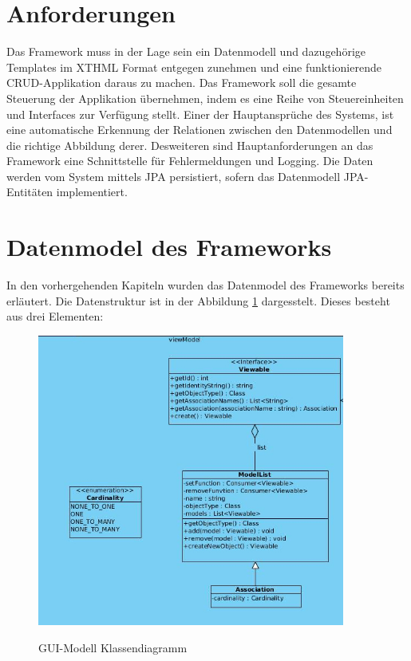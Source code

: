 \section{Anforderungen}

Das Framework muss in der Lage sein ein Datenmodell und dazugehörige Templates im XTHML Format entgegen zunehmen und eine funktionierende
CRUD-Applikation daraus zu machen. Das Framework soll die gesamte Steuerung der Applikation übernehmen, indem es eine
Reihe von Steuereinheiten und Interfaces zur Verfügung stellt. Einer der Hauptansprüche des Systems, ist eine
automatische Erkennung der Relationen zwischen den Datenmodellen und die richtige Abbildung derer.
Desweiteren sind Hauptanforderungen an das Framework eine Schnittstelle für Fehlermeldungen und Logging. 
Die Daten werden vom System mittels JPA persistiert, sofern das Datenmodell JPA-Entitäten implementiert.

\section{Datenmodel des Frameworks}

In den vorhergehenden Kapiteln wurden das Datenmodel des Frameworks bereits erläutert. Die Datenstruktur ist in der Abbildung
\ref{pic:guimodel} dargesstelt. Dieses besteht aus drei Elementen:\\



\begin{figure}[htb!]
	\caption{GUI-Modell Klassendiagramm}
	\includegraphics[width=0.9\textwidth]{content/pictures/Guimodel}
	\label{pic:guimodel}
\end{figure}

